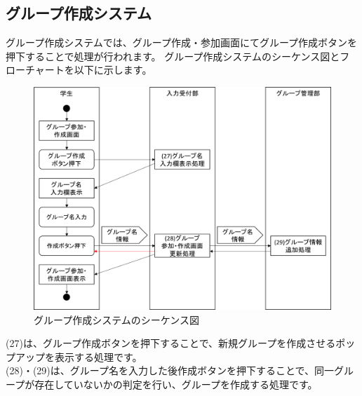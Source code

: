\clearpage

\subsection{グループ作成システム}
グループ作成システムでは、グループ作成・参加画面にてグループ作成ボタンを押下することで処理が行われます。
グループ作成システムのシーケンス図とフローチャートを以下に示します。

\begin{figure}[htbp]
  \begin{center}
    \includegraphics[width=1\linewidth,clip]{./img/seq7.png}
    \caption{グループ作成システムのシーケンス図}\label{fig:seq7}
  \end{center}
\end{figure}


(27)は、グループ作成ボタンを押下することで、新規グループを作成させるポップアップを表示する処理です。\\
(28)・(29)は、グループ名を入力した後作成ボタンを押下することで、同一グループが存在していないかの判定を行い、グループを作成する処理です。



